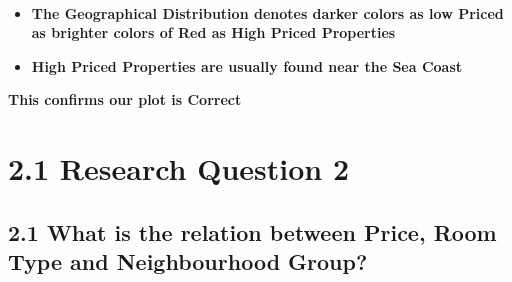\documentclass[11pt]{article}
\providecommand{\tightlist}{%
      \setlength{\itemsep}{0pt}\setlength{\parskip}{0pt}}
\begin{document}
    \begin{center}
    \end{center}
    { \hspace*{\fill} \\}
    
    \begin{itemize}
\tightlist
\item
  \textbf{The Geographical Distribution denotes darker colors as low
  Priced as brighter colors of Red as High Priced Properties}
\item
  \textbf{High Priced Properties are usually found near the Sea Coast}
\end{itemize}

\textbf{This confirms our plot is Correct}

    \hypertarget{research-question-2}{%
\section{2.1 Research Question 2}\label{research-question-2}}

\hypertarget{what-is-the-relation-between-price-room-type-and-neighbourhood-group}{%
\subsection{2.1 What is the relation between Price, Room Type and
Neighbourhood
Group?}\label{what-is-the-relation-between-price-room-type-and-neighbourhood-group}}
\end{document}
